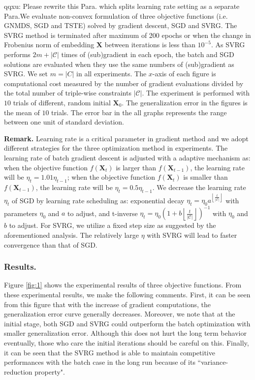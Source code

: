 \documentclass[letterpaper]{article}
\newcommand{\qqxu}[1]{\textcolor[rgb]{0.00,1.00,0.00}{#1}}
\begin{document}
		\qqxu{qqxu: Please rewrite this Para. which splits learning rate setting as a separate Para.}We evaluate non-convex formulation of three objective functions (i.e. GNMDS, SGD and TSTE) solved by gradient descent, SGD and SVRG.
		The SVRG method is terminated after maximum of 200 epochs or when the change in Frobenius norm of embedding $\mathbf{X}$ between iterations is less than $10^{-5}$. As SVRG performs $2m+|\mathcal{C}|$ times of (sub)gradient in each epoch, the batch and SGD solutions are evaluated when they use the same numbers of (sub)gradient as SVRG. We set $m=|C|$ in all experiments. The $x$-axis of each figure is computational cost measured by the number of gradient evaluations divided by the total number of triple-wise constraints $|\mathcal{C}|$. The experiment is performed with $10$ trials of different, random initial $\mathbf{X}_0$. The generalization error in the figures is the mean of $10$ trials. The error bar in the all graphs represents the range between one unit of standard deviation.

		\textbf{Remark. }Learning rate is a critical parameter in gradient method and we adopt different strategies for the three optimization method in experiments. The learning rate of batch gradient descent is adjusted with a adaptive mechanism as: when the objective function $f(\mathbf{X}_t)$ is larger than $f(\mathbf{X}_{t-1})$, the learning rate will be $\eta_t=1.01\eta_{t-1}$; when the objective function $f(\mathbf{X}_t)$ is smaller than $f(\mathbf{X}_{t-1})$, the learning rate will be $\eta_t=0.5\eta_{t-1}$. We decrease the learning rate $\eta_t$ of SGD by learning rate scheduling as: exponential decay $\eta_t = \eta_0 a^{\left \lfloor \frac{t}{|\mathcal{C}|} \right \rfloor}$ with parameters $\eta_0$ and $a$ to adjust, and t-inverse $\eta_t = \eta_0(1 + b\left \lfloor \frac{t}{|\mathcal{C}|} \right \rfloor)^{-1}$ with $\eta_0$ and $b$ to adjust. For SVRG, we utilize a fixed step size as suggested by the aforementioned analysis. The relatively large $\eta$ with SVRG will lead to faster convergence than that of SGD.

		\subsubsection{Results.}
		Figure \ref{fig:1} shows the experimental results of three objective functions. From these experimental results, we make the following comments. First, it can be seen from this figure that with the increase of gradient computations, the generalization error curve generally decreases. Moreover, we note that at the initial stage, both SGD and SVRG could outperform the batch optimization with smaller generalization error. Although this does not hurt the long term behavior eventually, those who care the initial iterations should be careful on this. Finally, it can be seen that the SVRG method is able to maintain competitive performances with the batch case in the long run because of its ``variance-reduction property". 
\end{document}
